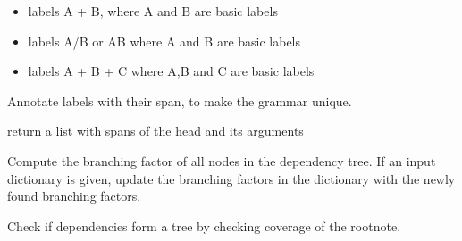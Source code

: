 \documentclass[letterpaper,10pt,english]{sphinxmanual}
\begin{document}
\begin{fulllineitems}
\begin{fulllineitems}
\begin{itemize}
\item {} 
labels A + B, where A and B are basic labels

\item {} 
labels A/B or AB where A and B are basic labels

\item {} 
labels A + B + C where A,B and C are basic labels

\end{itemize}

\end{fulllineitems}


\begin{fulllineitems}
\label{dependencies:dependencies.Dependencies.annotate_span}
Annotate labels with their span, to make the
grammar unique.

\end{fulllineitems}


\begin{fulllineitems}
\label{dependencies:dependencies.Dependencies.argument_list}
return a list with spans of the head and
its arguments

\end{fulllineitems}


\begin{fulllineitems}
\label{dependencies:dependencies.Dependencies.branching_factor}
Compute the branching factor of all nodes in the
dependency tree. If an input dictionary is given,
update the branching factors in the dictionary with
the newly found branching factors.

\end{fulllineitems}


\begin{fulllineitems}
\label{dependencies:dependencies.Dependencies.checkroot}
Check if dependencies form a tree by checking coverage
of the rootnote.


\end{fulllineitems}
\end{fulllineitems}
\end{document}

